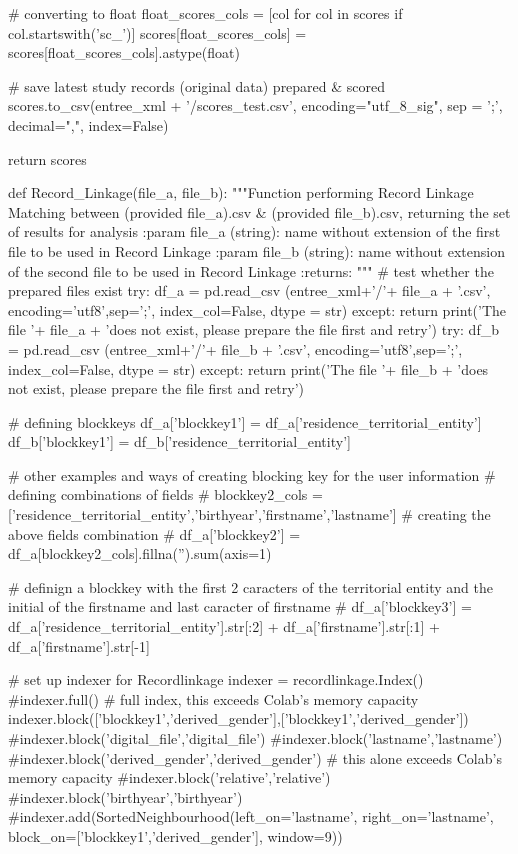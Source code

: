 \documentclass[a4paper,12pt,twoside]{book}
\begin{document}
\begin{python}
  
  # converting to float
  float_scores_cols = [col for col in scores if col.startswith('sc_')]
  scores[float_scores_cols] = scores[float_scores_cols].astype(float)
  
  # save latest study records (original data) prepared & scored
  scores.to_csv(entree_xml + '/scores_test.csv', encoding="utf_8_sig", sep = ';', decimal=",", index=False)

  return scores

def Record_Linkage(file_a, file_b):
  """Function performing Record Linkage Matching between (provided file_a).csv & (provided file_b).csv, returning the set of results for analysis
    :param file_a (string): name without extension of the first file to be used in Record Linkage
    :param file_b (string): name without extension of the second file to be used in Record Linkage
    :returns: 
  """
  # test whether the prepared files exist
  try:
    df_a = pd.read_csv (entree_xml+'/'+ file_a + '.csv', encoding='utf8',sep=';', index_col=False, dtype = str)
  except:
    return print('The file '+ file_a + 'does not exist, please prepare the file first and retry')
  try:
    df_b = pd.read_csv (entree_xml+'/'+ file_b + '.csv', encoding='utf8',sep=';', index_col=False, dtype = str)
  except:
    return print('The file '+ file_b + 'does not exist, please prepare the file first and retry')
  

  # defining blockkeys
  df_a['blockkey1'] = df_a['residence_territorial_entity']
  df_b['blockkey1'] = df_b['residence_territorial_entity']

  # other examples and ways of creating blocking key for the user information
  # defining combinations of fields
  # blockkey2_cols = ['residence_territorial_entity','birthyear','firstname','lastname']
  # creating the above fields combination
  # df_a['blockkey2'] = df_a[blockkey2_cols].fillna('').sum(axis=1)

  # definign a blockkey with the first 2 caracters of the territorial entity and the initial of the firstname and last caracter of firstname
  # df_a['blockkey3'] = df_a['residence_territorial_entity'].str[:2] + df_a['firstname'].str[:1] + df_a['firstname'].str[-1]
  
  # set up indexer for Recordlinkage
  indexer = recordlinkage.Index()
  #indexer.full() # full index, this exceeds Colab's memory capacity
  indexer.block(['blockkey1','derived_gender'],['blockkey1','derived_gender'])
  #indexer.block('digital_file','digital_file')
  #indexer.block('lastname','lastname')
  #indexer.block('derived_gender','derived_gender') # this alone exceeds Colab's memory capacity
  #indexer.block('relative','relative')
  #indexer.block('birthyear','birthyear')
  #indexer.add(SortedNeighbourhood(left_on='lastname', right_on='lastname', block_on=['blockkey1','derived_gender'], window=9))


\end{python}
\end{document}
